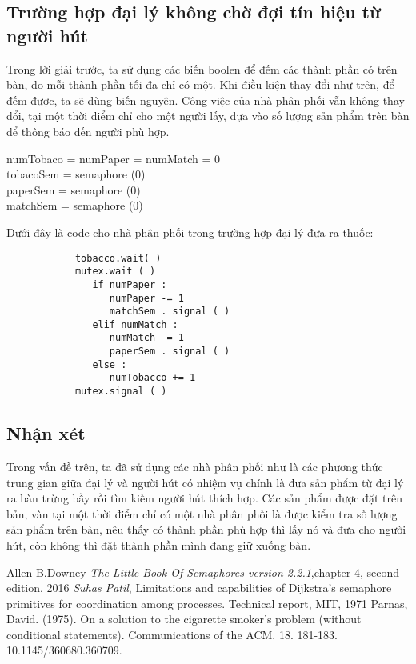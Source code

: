 \documentclass[a4paper]{article}
\begin{document}
	\subsection{Trường hợp đại lý không chờ đợi tín hiệu từ người hút}
	Trong lời giải trước, ta sử dụng các biến boolen để đếm các thành phần có trên bàn, do mỗi thành phần
	tối đa chỉ có một. Khi điều kiện thay đổi như trên, để đếm được, ta sẽ dùng biến nguyên. Công việc của 
	nhà phân phối vẫn không thay đổi, tại một thời điểm chỉ cho một người lấy, dựa vào số lượng sản phẩm 
	trên bàn để thông báo đến người phù hợp.
	\begin{tcolorbox}
	numTobaco = numPaper = numMatch = 0 \\
	tobacoSem = semaphore (0) \\
	paperSem = semaphore (0) \\
	matchSem = semaphore (0)
	\end{tcolorbox}
	Dưới đây là code cho nhà phân phối trong trường hợp đại lý đưa ra thuốc: \\
	\begin{tcolorbox}
		\begin{verbatim}
		 	tobacco.wait( )
			mutex.wait ( )
			   if numPaper :
			      numPaper -= 1
			      matchSem . signal ( )
			   elif numMatch :
			      numMatch -= 1
			      paperSem . signal ( )
			   else :
			      numTobacco += 1
			mutex.signal ( )
		\end{verbatim}
	\end{tcolorbox}	
	
	\subsection{Nhận xét}
	Trong vấn đề trên, ta đã sử dụng các nhà phân phối như là các phương thức trung gian giữa đại lý và người hút 
	có nhiệm vụ chính là đưa sản phẩm từ đại lý ra bàn trừng bầy rồi tìm kiếm người hút thích hợp. Các sản phẩm được đặt 			trên bản, vàn tại một thời điểm chỉ 
	có một nhà phân phối là được kiểm tra số lượng sản phẩm trên bàn, nêu thấy có thành phần phù hợp thì lấy nó và
	đưa cho người hút, còn không thì đặt thành phần mình đang giữ xuống bàn. 
	
	
	
	
	\pagebreak
	\begin{thebibliography}{9}
  	Allen B.Downey
  	\textit{The Little Book Of Semaphores version 2.2.1},chapter 4, second edition, 2016
  	\textit{Suhas Patil},  Limitations and capabilities of Dijkstra’s semaphore primitives
	for coordination among processes. Technical report, MIT, 1971
	\textit{}Parnas, David. (1975). On a solution to the cigarette smoker's problem (without conditional statements). Communications of the ACM. 18. 181-183. 10.1145/360680.360709. 
	\end{thebibliography}
\end{document}
